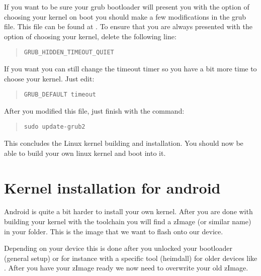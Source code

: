 \npar

If you want to be sure your grub bootloader will present you with the option of choosing your kernel on boot you should make a few modifications in the grub file. This file can be found at . To ensure that you are always presented with the option of choosing your kernel, delete the following line:

\begin{quote} \begin{verbatim}GRUB_HIDDEN_TIMEOUT_QUIET \end{verbatim} \end{quote}

If you want you can still change the timeout timer so you have a bit more time to choose your kernel. Just edit:

\begin{quote} \begin{verbatim}GRUB_DEFAULT timeout \end{verbatim} \end{quote}

After you modified this file, just finish with the command:

\begin{quote} \begin{verbatim}sudo update-grub2 \end{verbatim} \end{quote}

This concludes the Linux kernel building and installation. You should now be able to build your own linux kernel and boot into it.

\section*{Kernel installation for android}

Android is quite a bit harder to install your own kernel. After you are done with building your kernel with the toolchain you will find a zImage (or similar name) in your  folder. This is the image that we want to flash onto our device.

\npar

Depending on your device this is done after you unlocked your bootloader (general setup) or for instance with a specific tool (heimdall) for older devices like . After you have your zImage ready we now need to overwrite your old zImage. \\

